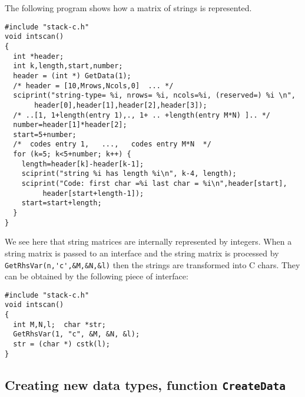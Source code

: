 The following program shows how a matrix of strings is represented.
\begin{verbatim}
#include "stack-c.h"
void intscan() 
{
  int *header; 
  int k,length,start,number;
  header = (int *) GetData(1);
  /* header = [10,Mrows,Ncols,0]  ... */
  sciprint("string-type= %i, nrows= %i, ncols=%i, (reserved=) %i \n", 
	   header[0],header[1],header[2],header[3]);
  /* ..[1, 1+length(entry 1),., 1+ .. +length(entry M*N) ].. */
  number=header[1]*header[2];
  start=5+number; 
  /*  codes entry 1,   ...,   codes entry M*N  */
  for (k=5; k<5+number; k++) {
    length=header[k]-header[k-1];
    sciprint("string %i has length %i\n", k-4, length);
    sciprint("Code: first char =%i last char = %i\n",header[start],
	     header[start+length-1]);	
    start=start+length;
  }
}
\end{verbatim}
We see here that string matrices are internally represented by integers. 
When a string matrix is passed to an interface and the
string matrix is processed by \verb!GetRhsVar(n,'c',&M,&N,&l)!
then the strings are transformed into C chars.
They can be obtained by the following piece of interface:
\begin{verbatim}
#include "stack-c.h"
void intscan() 
{
  int M,N,l;  char *str;
  GetRhsVar(1, "c", &M, &N, &l);
  str = (char *) cstk(l);
}
\end{verbatim}

\subsection{Creating new data types, function {\tt CreateData}}

